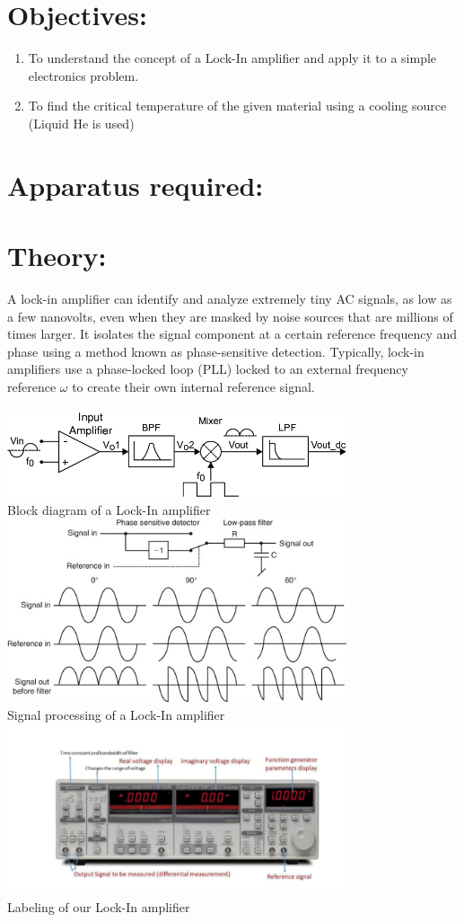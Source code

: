 \documentclass[]{report}[12 pt]
\begin{document}
	
	\section*{Objectives:}
	\begin{enumerate}
		\item To understand the concept of a Lock-In amplifier and apply it to a simple electronics problem.
		\item To find the critical temperature of the given material using a cooling source (Liquid He is used)
	\end{enumerate}
	\section*{Apparatus required:}

	\section*{Theory:}
A lock-in amplifier can identify and analyze extremely tiny AC signals, as low as a few nanovolts, even when they are masked by noise sources that are millions of times larger. It isolates the signal component at a certain reference frequency and phase using a method known as phase-sensitive detection.
Typically, lock-in amplifiers use a phase-locked loop (PLL) locked to an external frequency reference $\omega$  to create their own internal reference signal.
\begin{center}
	\includegraphics[width=10cm]{lia1.png}\\
	Block diagram of a Lock-In amplifier\\
		\includegraphics[width=10cm]{lia2.jpg}\\
		Signal processing of a Lock-In amplifier\\
		\includegraphics[width=10cm]{lia3.png}\\
		Labeling of our Lock-In amplifier
\end{center}
\end{document}
